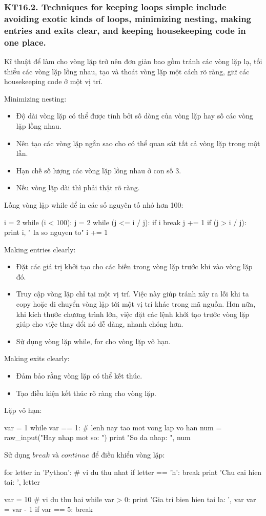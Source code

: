 \documentclass[12pt]{report}
\begin{document}
\subsubsection{KT16.2. Techniques for keeping loops simple include avoiding exotic kinds of loops, minimizing nesting, making entries and exits clear, and keeping housekeeping code in one place.}
Kĩ thuật để làm cho vòng lặp trở nên đơn giản bao gồm tránh các vòng lặp lạ, tối thiểu các vòng lặp lồng nhau, tạo và thoát vòng lặp một cách rõ ràng, giữ các housekeeping code ở một vị trí.
\vspace*{3mm}

\noindent Minimizing nesting:
\begin{itemize}
	\item Độ dài vòng lặp có thể được tính bởi số dòng của vòng lặp hay số các vòng lặp lồng nhau.
	\item Nên tạo các vòng lặp ngắn sao cho có thể quan sát tất cả vòng lặp trong một lần.
	\item Hạn chế số lượng các vòng lặp lồng nhau ở con số 3.
	\item Nếu vòng lặp dài thì phải thật rõ ràng.
\end{itemize}
Lồng vòng lặp while để in các số nguyên tố nhỏ hơn 100:
\begin{python}
i = 2
while (i < 100):
	j = 2
	while (j <= i / j):
		if i %
			break
		j += 1
	if (j > i / j):
		print i, " la so nguyen to"
	i += 1
\end{python}

\noindent Making entries clearly:
\begin{itemize}
	\item Đặt các giá trị khởi tạo cho các biến trong vòng lặp trước khi vào vòng lặp đó.
	\item Truy cập vòng lặp chỉ tại một vị trí. Việc này giúp tránh xảy ra lỗi khi ta copy hoặc di chuyển vòng lặp tới một vị trí khác trong mã nguồn. Hơn nữa, khi kích thước chương trình lớn, việc đặt các lệnh khởi tạo trước vòng lặp giúp cho việc thay đổi nó dễ dàng, nhanh chóng hơn.
	\item Sử dụng vòng lặp while, for cho vòng lặp vô hạn.
\end{itemize}

\noindent Making exits clearly:
\begin{itemize}
	\item Đảm bảo rằng vòng lặp có thể kết thúc.
	\item Tạo điều kiện kết thúc rõ ràng cho vòng lặp.
\end{itemize}
Lặp vô hạn:
\begin{python}
var = 1
while var == 1: 	# lenh nay tao mot vong lap vo han
	num = raw_input("Hay nhap mot so: ")
	print "So da nhap: ", num
\end{python}
Sử dụng $break$ và $continue$ để điều khiển vòng lặp: 
\begin{python}
for letter in 'Python': 	# vi du thu nhat
	if letter == 'h':
		break
	print 'Chu cai hien tai: ', letter

var = 10					# vi du thu hai
while var > 0:
	print 'Gia tri bien hien tai la: ', var
	var = var - 1
	if var == 5:
		break
\end{python}
\end{document}
